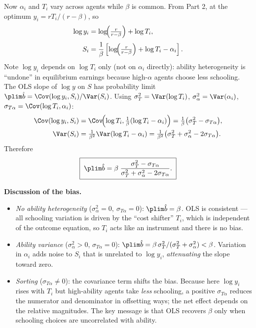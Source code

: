 \documentclass[11pt,english]{article}
\begin{document}
Now $\alpha_{i}$ and $T_{i}$ vary across agents while $\beta$ is common. From
Part 2, at the optimum $y_{i}=rT_{i}/(r-\beta)$, so
\begin{align}
\log y_{i} &= \log\!\Bigl(\tfrac{r}{r-\beta}\Bigr)+\log T_{i}, \\[2pt]
S_{i}      &= \frac{1}{\beta}\left[\log\!\Bigl(\tfrac{r}{r-\beta}\Bigr)+\log T_{i}-\alpha_{i}\right].
\end{align}
Note $\log y_i$ depends on $\log T_i$ only (not on $\alpha_i$ directly): ability
heterogeneity is ``undone'' in equilibrium earnings because high-$\alpha$ agents
choose less schooling. The OLS slope of $\log y$ on $S$ has probability limit
$\plim\hat{b}=\Cov(\log y_{i},S_{i})/\Var(S_{i})$. Using
$\sigma_{T}^{2}=\Var(\log T_i)$, $\sigma_{\alpha}^{2}=\Var(\alpha_i)$,
$\sigma_{T\alpha}=\Cov(\log T_i,\alpha_i)$:
\begin{align}
\Cov(\log y_i,S_i)&=\Cov\!\Bigl(\log T_i,\tfrac{1}{\beta}(\log T_i-\alpha_i)\Bigr)
=\tfrac{1}{\beta}\bigl(\sigma_T^2-\sigma_{T\alpha}\bigr),\\
\Var(S_i)&=\tfrac{1}{\beta^2}\Var(\log T_i-\alpha_i)
=\tfrac{1}{\beta^2}\bigl(\sigma_T^2+\sigma_\alpha^2-2\sigma_{T\alpha}\bigr).
\end{align}
Therefore
\begin{equation}\boxed{\;
\plim\hat{b}=\beta\;\frac{\sigma_T^2-\sigma_{T\alpha}}
{\sigma_T^2+\sigma_\alpha^2-2\sigma_{T\alpha}}.
\;}\end{equation}

\textbf{Discussion of the bias.}
\begin{itemize}[nosep]
\item \emph{No ability heterogeneity} ($\sigma_\alpha^2=0,\ \sigma_{T\alpha}=0$):
$\plim\hat b=\beta$. OLS is consistent --- all schooling variation is driven by
the ``cost shifter'' $T_i$, which is independent of the outcome equation, so
$T_i$ acts like an instrument and there is no bias.
\item \emph{Ability variance} ($\sigma_\alpha^2>0$, $\sigma_{T\alpha}=0$):
$\plim\hat b=\beta\,\sigma_T^2/(\sigma_T^2+\sigma_\alpha^2)<\beta$. Variation in
$\alpha_i$ adds noise to $S_i$ that is unrelated to $\log y_i$, \emph{attenuating}
the slope toward zero.
\item \emph{Sorting} ($\sigma_{T\alpha}\neq0$): the covariance term shifts the
bias. Because here $\log y_i$ rises with $T_i$ but high-ability agents take
\emph{less} schooling, a positive $\sigma_{T\alpha}$ reduces the numerator and
denominator in offsetting ways; the net effect depends on the relative
magnitudes. The key message is that OLS recovers $\beta$ only when schooling
choices are uncorrelated with ability.
\end{itemize}
\end{document}
